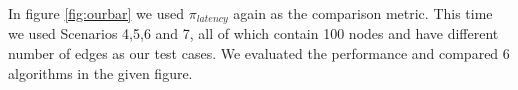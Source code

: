 \documentclass[10pt]{extarticle}
\begin{document}
	In figure \ref{fig:ourbar} we used $\pi_{latency}$ again as the comparison metric. This time we used Scenarios 4,5,6 and 7, all of which contain 100 nodes and have different number of edges as our test cases. We evaluated the performance and compared 6 algorithms in the given figure.
	
	
	
\end{document}
